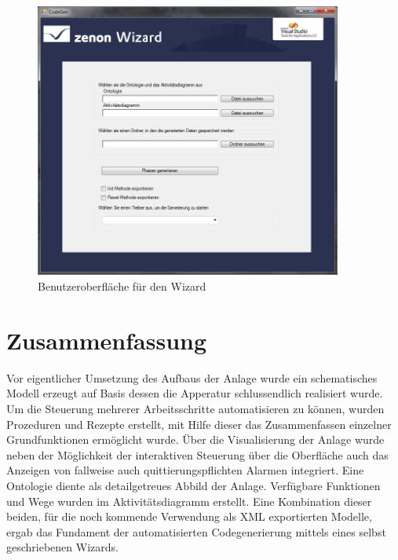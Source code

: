 \begin{figure}[hbt!]
  \centering
  \includegraphics[width=0.9\textwidth]{graphics/implementation/wizard_final}
  \caption{Benutzeroberfläche für den Wizard}
\end{figure}

\newpage
\section{Zusammenfassung}
Vor eigentlicher Umsetzung des Aufbaus der Anlage wurde ein schematisches Modell erzeugt auf Basis dessen die Apperatur schlussendlich realisiert wurde. Um die Steuerung mehrerer Arbeitsschritte automatisieren zu können, wurden Prozeduren und Rezepte erstellt, mit Hilfe dieser das Zusammenfassen einzelner Grundfunktionen ermöglicht wurde. Über die Visualisierung der Anlage wurde neben der Möglichkeit der interaktiven Steuerung über die Oberfläche auch das Anzeigen von fallweise auch quittierungspflichten Alarmen integriert. Eine Ontologie diente als detailgetreues Abbild der Anlage. Verfügbare Funktionen und Wege wurden im Aktivitätsdiagramm erstellt. Eine Kombination dieser beiden, für die noch kommende Verwendung als XML exportierten Modelle, ergab das Fundament der automatisierten Codegenerierung mittels eines selbst geschriebenen Wizards.


